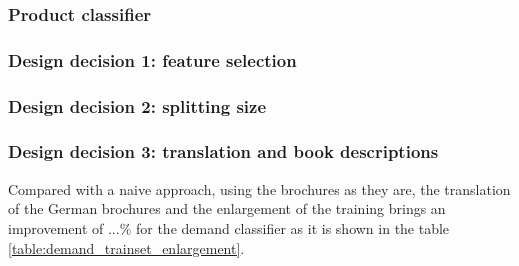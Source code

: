 \subsubsection{Product classifier}
\label{ssub:product_classifier}

\subsubsection{Design decision 1: feature selection}

\subsubsection{Design decision 2: splitting size}

\subsubsection{Design decision 3: translation and book descriptions}

Compared with a naive approach, using the brochures as they are, the translation of the German brochures and the enlargement of the training brings an improvement of ...\% for the demand classifier as it is shown in the table \ref{table:demand_trainset_enlargement}.

\endinput
\begin{itemize}
	\item Introduce our data set (show numbers, show examples)
	\item How we got our training data (everything at least twice, use the demands for learning, use the products for evaluation, Active Learning approach)
	\item Reference Precision/Recall from above again, final
	\item Evaluate of the training data generation, which approach is best (random, grouping)
\end{itemize}


